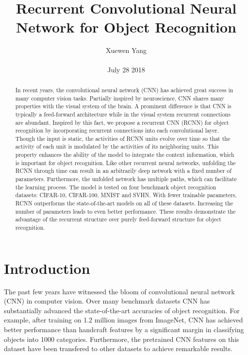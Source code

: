 \documentclass[10pt,twocolumn,letterpaper]{article}
\author{Xuewen Yang\\\\
July 28 2018}
\title{Recurrent Convolutional Neural Network for Object Recognition}
\begin{document}
\maketitle
\begin{abstract}
In recent years, the convolutional neural network (CNN)
has achieved great success in many computer vision tasks.
Partially inspired by neuroscience, CNN shares many properties
with the visual system of the brain. A prominent difference
is that CNN is typically a feed-forward architecture
while in the visual system recurrent connections are abundant.
Inspired by this fact, we propose a recurrent CNN
(RCNN) for object recognition by incorporating recurrent
connections into each convolutional layer. Though the input
is static, the activities of RCNN units evolve over time
so that the activity of each unit is modulated by the activities
of its neighboring units. This property enhances
the ability of the model to integrate the context information,
which is important for object recognition. Like other
recurrent neural networks, unfolding the RCNN through
time can result in an arbitrarily deep network with a fixed
number of parameters. Furthermore, the unfolded network
has multiple paths, which can facilitate the learning process.
The model is tested on four benchmark object recognition
datasets: CIFAR-10, CIFAR-100, MNIST and SVHN.
With fewer trainable parameters, RCNN outperforms the
state-of-the-art models on all of these datasets. Increasing
the number of parameters leads to even better performance.
These results demonstrate the advantage of the recurrent
structure over purely feed-forward structure for object
recognition.
\end{abstract}
\section{Introduction}
The past few years have witnessed the bloom of convolutional neural network (CNN) in computer vision. Over many benchmark datasets CNN has substantially advanced the state-of-the-art accuracies of object recognition\cite{Krizhevsky2012ImageNet}\cite{Chatfield2014Return}\cite{Lin2013Network}. For example, after training on 1.2 million images from ImageNet, CNN has achieved better performance than handcraft features by a significant margin in
classifying objects into 1000 categories. Furthermore, the pretrained CNN features on this dataset have been transfered to other datasets to achieve remarkable results.
\end{document}
